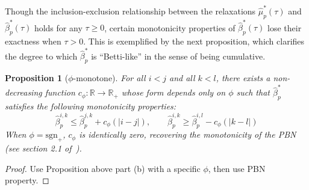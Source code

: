 \documentclass[10pt]{article}
\numberwithin{equation}{section}
\newcommand{\+}{%
	\raisebox{0.18ex}{\scaleobj{0.55}{+}}
}
\newtheorem{proposition}{Proposition}
\theoremstyle{definition}
\theoremstyle{definition}
\begin{document}
\noindent Though the inclusion-exclusion relationship between the relaxations $\hat{\mu}_{p}^\ast(\tau)$ and $\hat{\beta}_{p}^{\ast}(\tau)$ holds for any $\tau \geq 0$, certain monotonicity properties of $\hat{\beta}_{p}^{\ast}(\tau)$ lose their exactness when $\tau > 0$.
This is exemplified by the next proposition, which clarifies the degree to which $\hat{\beta}_p^\ast$ is ``Betti-like'' in the sense of being cumulative. 
\begin{proposition}[$\phi$-monotone]
For all $i < j$ and all $k < l$, there exists a non-decreasing function $c_\phi : \mathbb{R} \to \mathbb{R}_+$ whose form depends only on $\phi$ such that $\hat{\beta}_p^\ast$ satisfies the following monotonicity properties:
\begin{equation}
	\hat{\beta}_p^{i,k} \leq \hat{\beta}_p^{j,k} + c_\phi(\lvert i - j \rvert), \quad \quad \hat{\beta}_p^{i,k} \geq \hat{\beta}_p^{i,l} - c_\phi(\lvert k - l \rvert)
\end{equation}
When $\phi = \mathrm{sgn}_+$, $c_\phi$ is identically zero, recovering the monotonicity of the PBN (see section 2.1 of~\cite{cerri2013betti}). 
\end{proposition}
\begin{proof}
	Use Proposition above part (b) with a specific $\phi$, then use PBN property.
\end{proof}

\end{document}
